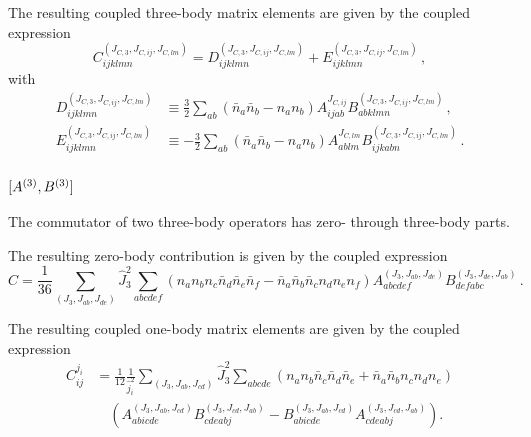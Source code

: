 The resulting coupled three-body matrix elements are given by the coupled expression
\begin{equation}
  C_{ijklmn}^{(J_{C,3}, J_{C, ij}, J_{C, lm})}
  = D_{ijklmn}^{(J_{C,3}, J_{C, ij}, J_{C, lm})}
  + E_{ijklmn}^{(J_{C,3}, J_{C, ij}, J_{C, lm})}\,,
\end{equation}
with
\begin{align}
  D_{ijklmn}^{(J_{C,3}, J_{C, ij}, J_{C, lm})}
   & \equiv \frac{3}{2} \sum_{ab} (\bar{n}_a \bar{n}_b - n_a n_b)
  A_{ijab}^{J_{C, ij}}
  B_{abklmn}^{(J_{C,3}, J_{C, ij}, J_{C, lm})}\,,                 \\
  E_{ijklmn}^{(J_{C,3}, J_{C,ij}, J_{C,lm})}
   & \equiv
  -\frac{3}{2} \sum_{ab} (\bar{n}_a \bar{n}_b - n_a n_b)
  A_{ablm}^{J_{C, lm}}
  B_{ijkabn}^{(J_{C,3}, J_{C, ij}, J_{C, lm})}\,.
\end{align}

\subsubsection{
  \texorpdfstring{$[{A}^{(3)}, {B}^{(3)}]$}{[3, 3]}
}

The commutator of two three-body operators has
zero- through three-body parts.

The resulting zero-body contribution is given by the coupled expression
\begin{equation}
  C = \frac{1}{36}
  \sum_{(J_3, J_{ab}, J_{de})} \hat{J}_{3}^2
  \sum_{abcdef}
  (
  n_a n_b n_c \bar{n}_d \bar{n}_e \bar{n}_f
  - \bar{n}_a \bar{n}_b \bar{n}_c n_d n_e n_f
  )
  A_{abcdef}^{(J_{3}, J_{ab}, J_{de})}
  B_{defabc}^{(J_{3}, J_{de}, J_{ab})}\,.
\end{equation}

The resulting coupled one-body matrix elements are given by the coupled expression
\begin{equation}
  \begin{split}
    C_{ij}^{j_i} & = \frac{1}{12} \frac{1}{\hat{j}_{i}^2}
    \sum_{(J_{3}, J_{ab}, J_{cd})} \hat{J}_{3}^2
    \sum_{abcde} (
    n_a n_b \bar{n}_c \bar{n}_d \bar{n}_e
    + \bar{n}_a \bar{n}_b n_c n_d n_e
    ) \\
    & \quad \left(
    A_{abicde}^{(J_3, J_{ab}, J_{cd})}
    B_{cdeabj}^{(J_3, J_{cd}, J_{ab})}
    - B_{abicde}^{(J_3, J_{ab}, J_{cd})}
    A_{cdeabj}^{(J_3, J_{cd}, J_{ab})}
    \right).
  \end{split}
\end{equation}

